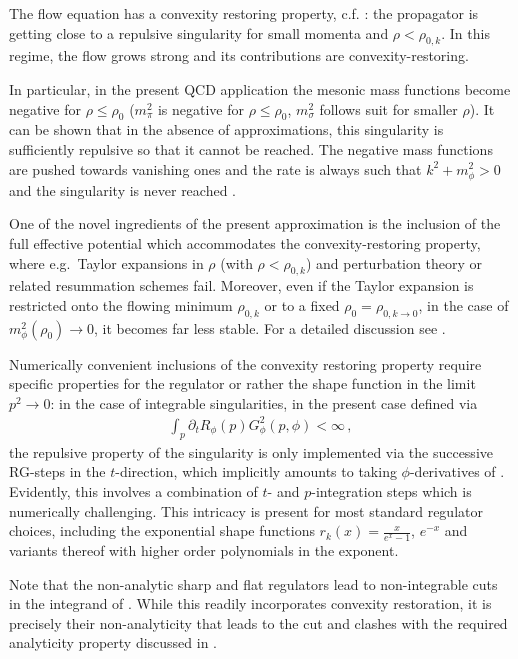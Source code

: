 \documentclass[aps,twocolumn,prd,superscriptaddress]{revtex4-2}
\begin{document}
The flow equation has a convexity restoring property, c.f. \cite{Litim:2006nn}: the propagator is getting close to a repulsive singularity for small momenta and $\rho< \rho_{0,k}$. In this regime, the flow grows strong and its contributions are convexity-restoring. 

In particular, in the present QCD application the mesonic mass functions  become negative for $\rho\leq \rho_0$ ($m^2_\pi$ is negative for $\rho\leq \rho_0$, $m^2_\sigma$ follows suit for smaller $\rho$). It can be shown that in the absence of approximations, this singularity is sufficiently repulsive so that it cannot be reached. The negative mass functions are pushed towards vanishing ones and the rate is always such that $k^2+m_\phi^2 > 0$ and the singularity is never reached \cite{Litim:2006nn}. 

One of the novel ingredients of the present approximation is the inclusion of the full effective potential which accommodates the convexity-restoring property, where e.g.~Taylor expansions in $\rho$ (with $\rho<\rho_{0,k}$) and perturbation theory or related resummation schemes fail. Moreover, even if the Taylor expansion is restricted onto the flowing minimum $\rho_{0,k}$ or to a fixed $\rho_0 = \rho_{0,k\to0}$, in the case of $m^2_\phi(\rho_0)\to 0$, it becomes far less stable. For a detailed discussion see \cite{Pawlowski:2014zaa}. 

Numerically convenient inclusions of the convexity restoring property require specific properties for the regulator or rather the shape function in the limit $p^2\to 0$: in the case of integrable singularities, in the present case defined via 
%
\begin{align} 
	\int_p \partial_t R_\phi(p) G_\phi^2(p,\phi) <\infty\,,
\label{eq:IntegrableSings}
\end{align}
%
the repulsive property of the singularity is only implemented via the successive RG-steps in the $t$-direction, which implicitly amounts to taking $\phi$-derivatives of . 
Evidently, this involves a combination of $t$- and $p$-integration steps which is numerically challenging. This intricacy is present for most standard regulator choices, including the exponential shape functions $r_k(x) = \frac{x}{e^{x}-1}$, $e^{-x}$ and variants thereof with higher order polynomials in the exponent. 

Note that the non-analytic sharp and flat regulators lead to non-integrable cuts in the integrand of . While this readily incorporates convexity restoration, it is precisely their non-analyticity that leads to the cut and clashes with the required analyticity property discussed in . 
\end{document}
